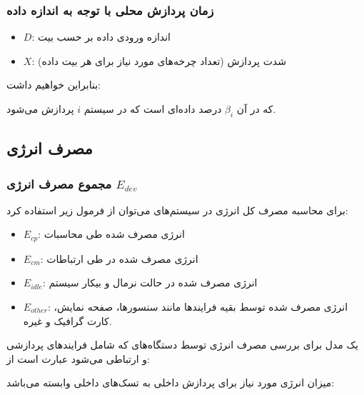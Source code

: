 \documentclass[a4paper]{article}
\begin{document}

\subsubsection{زمان پردازش محلی با توجه به اندازه داده }


\begin{itemize}
    \item $D$: اندازه ورودی داده بر حسب بیت
    \item $X$: شدت پردازش (تعداد چرخه‌های مورد نیاز برای هر بیت داده)
\end{itemize}

بنابراین خواهیم داشت:


که در آن $\beta_{i}$ درصد داده‌‌ای است که در سیستم $i$ پردازش می‌شود.

\subsection{مصرف انرژی}

\subsubsection{مجموع مصرف انرژی $E_{dev}$}

برای محاسبه مصرف کل انرژی در سیستم‌های  می‌توان از فرمول زیر استفاده
کرد:


\begin{itemize}
    \item $E_{cp}$: انرژی مصرف شده طی محاسبات
    \item $E_{cm}$: انرژی مصرف شده در طی ارتباطات
    \item $E_{idle}$: انرژی مصرف شده در حالت نرمال و بیکار سیستم
    \item $E_{other}$: انرژی مصرف شده توسط بقیه فرایند‌ها مانند سنسور‌ها، صفحه
    نمایش، کارت گرافیک و غیره.
\end{itemize}

یک مدل برای بررسی مصرف انرژی توسط دستگاه‌های  که شامل فرایند‌های پردازشی
و ارتباطی می‌شود عبارت است از:


میزان انرژی مورد نیاز برای پردازش داخلی به تسک‌های داخلی وابسته می‌باشد:
\end{document}
